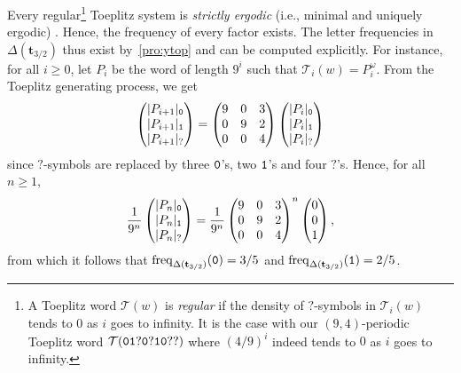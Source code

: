 \documentclass[12pt,reqno]{article}
\DeclareMathOperator{\freq}{freq}
\newcommand{\que}{\mathord{?}}
\begin{document}
Every regular\footnote{A Toeplitz word $\mathcal{T}(w)$ is \emph{regular} if the density of $\que$-symbols in $\mathcal{T}_i(w)$ tends to $0$ as $i$ goes to infinity.  It is the case with our $(9,4)$-periodic Toeplitz word $\mathcal{T}({\tt 01}\que{\tt 0}\que{\tt 10}\que\que)$ where $(4/9)^i$ indeed tends to $0$ as $i$ goes to infinity.} Toeplitz system is \emph{strictly ergodic} (i.e.,  minimal and uniquely ergodic) \cite{JacobsKeane1969}. Hence, the frequency of every factor exists.
The letter frequencies in $\Delta(\mathbf{t}_{3/2})$ thus exist by~\cref{pro:ytop} and can be computed explicitly. For instance,  for all $i\ge 0$,  let $P_i$ be the word of length $9^i$ such that $\mathcal{T}_i(w)=P_i^\omega$. From the Toeplitz generating process, we get
\[
  \begin{pmatrix}
    |P_{i+1}|_{\tt 0}\\
    |P_{i+1}|_{\tt 1}\\
    |P_{i+1}|_{\que}\\
  \end{pmatrix}=
  \begin{pmatrix}
    9&0&3\\
    0&9&2\\
    0&0&4\\
  \end{pmatrix}\begin{pmatrix}
    |P_{i}|_{\tt 0}\\
    |P_{i}|_{\tt 1}\\
    |P_{i}|_{\que}\\
  \end{pmatrix}
\]
since $\que$-symbols are replaced by three ${\tt 0}$'s,  two ${\tt 1}$'s and four $\que$'s.
Hence, for all $n\ge 1$, 
\[
  \frac{1}{9^n}
  \begin{pmatrix}
    |P_{n}|_{\tt 0}\\
    |P_{n}|_{\tt 1}\\
    |P_{n}|_{\que}\\
  \end{pmatrix}= \frac{1}{9^n}\begin{pmatrix}
    9&0&3\\
    0&9&2\\
    0&0&4\\
  \end{pmatrix}^n
  \begin{pmatrix}
    0\\0\\1
  \end{pmatrix},
\]
from which it follows that $\freq_{\Delta(\mathbf{t}_{3/2})}({\tt 0})=3/5$ and $\freq_{\Delta(\mathbf{t}_{3/2})}({\tt 1})=2/5$.
\end{document}
